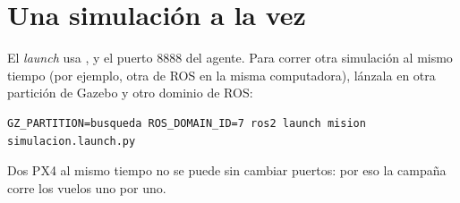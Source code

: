 \section{Una simulación a la vez}

El \emph{launch} usa ,  y el puerto 8888 del agente. Para correr otra
simulación al mismo tiempo (por ejemplo, otra de ROS en la misma computadora), lánzala en otra partición
de Gazebo y otro dominio de ROS:
\begin{lstlisting}[style=bash]
GZ_PARTITION=busqueda ROS_DOMAIN_ID=7 ros2 launch mision simulacion.launch.py
\end{lstlisting}
Dos PX4 al mismo tiempo no se puede sin cambiar puertos: por eso la campaña corre los vuelos uno por uno.
